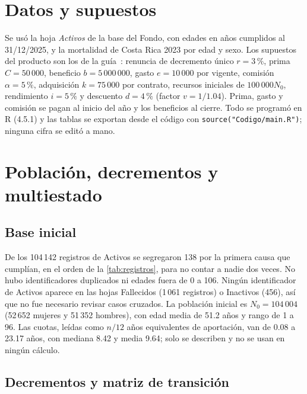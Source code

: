 \documentclass[10pt,a4paper]{article}
\numberwithin{equation}{section}
\begin{document}
	\section*{Datos y supuestos}\label{sec:datos}

	Se usó la hoja \textit{Activos} de la base del Fondo, con edades en años cumplidos al 31/12/2025, y la mortalidad de Costa Rica 2023 por edad y sexo. Los supuestos del producto son los de la guía~\cite{Guia2026}: renuncia de decremento único \(r=3\,\%\), prima \(C=50\,000\), beneficio \(b=5\,000\,000\), gasto \(e=10\,000\) por vigente, comisión \(\alpha=5\,\%\), adquisición \(k=75\,000\) por contrato, recursos iniciales de \(100\,000N_0\), rendimiento \(i=5\,\%\) y descuento \(d=4\,\%\) (factor \(v=1/1.04\)). Prima, gasto y comisión se pagan al inicio del año y los beneficios al cierre. Todo se programó en R (4.5.1) y las tablas se exportan desde el código con \texttt{source("Codigo/main.R")}; ninguna cifra se editó a mano.

	\section{Población, decrementos y multiestado}\label{sec:A}

	\subsection{Base inicial}

	De los 104\,142 registros de Activos se segregaron 138 por la primera causa que cumplían, en el orden de la \cref{tab:registros}, para no contar a nadie dos veces. No hubo identificadores duplicados ni edades fuera de 0 a 106. Ningún identificador de Activos aparece en las hojas Fallecidos (1\,061 registros) o Inactivos (456), así que no fue necesario revisar casos cruzados. La población inicial es \(N_0=104\,004\) (52\,652 mujeres y 51\,352 hombres), con edad media de 51.2 años y rango de 1 a 96. Las cuotas, leídas como \(n/12\) años equivalentes de aportación, van de 0.08 a 23.17 años, con mediana 8.42 y media 9.64; solo se describen y no se usan en ningún cálculo.

	\subsection{Decrementos y matriz de transición}
\end{document}
